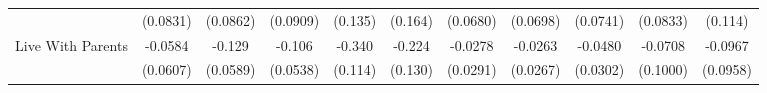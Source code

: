 {\begin{tabular}{l*{10}{c}}
            &    (0.0831)         &    (0.0862)         &    (0.0909)         &     (0.135)         &     (0.164)         &    (0.0680)         &    (0.0698)         &    (0.0741)         &    (0.0833)         &     (0.114)         \\
\addlinespace
Live With Parents&     -0.0584         &      -0.129\sym{*}  &      -0.106\sym{*}  &      -0.340\sym{**} &      -0.224         &     -0.0278         &     -0.0263         &     -0.0480         &     -0.0708         &     -0.0967         \\
            &    (0.0607)         &    (0.0589)         &    (0.0538)         &     (0.114)         &     (0.130)         &    (0.0291)         &    (0.0267)         &    (0.0302)         &    (0.1000)         &    (0.0958)         \\
\bottomrule
\end{tabular}
}
